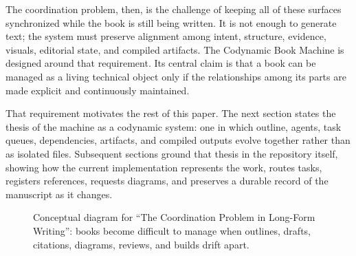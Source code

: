 \documentclass[11pt]{article}
\begin{document}
The coordination problem, then, is the challenge of keeping all of these surfaces synchronized while the book is still being written. It is not enough to generate text; the system must preserve alignment among intent, structure, evidence, visuals, editorial state, and compiled artifacts. The Codynamic Book Machine is designed around that requirement. Its central claim is that a book can be managed as a living technical object only if the relationships among its parts are made explicit and continuously maintained.

That requirement motivates the rest of this paper. The next section states the thesis of the machine as a codynamic system: one in which outline, agents, task queues, dependencies, artifacts, and compiled outputs evolve together rather than as isolated files. Subsequent sections ground that thesis in the repository itself, showing how the current implementation represents the work, routes tasks, registers references, requests diagrams, and preserves a durable record of the manuscript as it changes.

\begin{figure}[htbp]
\centering

\caption{Conceptual diagram for ``The Coordination Problem in Long-Form Writing'': books become difficult to manage when outlines, drafts, citations, diagrams, reviews, and builds drift apart.}
\end{figure}
\end{document}
